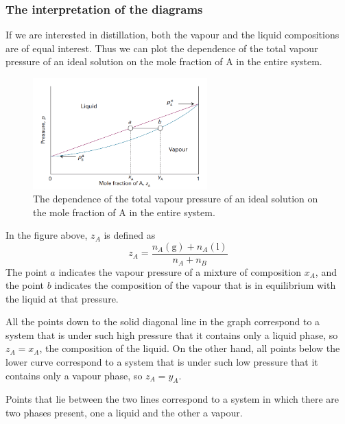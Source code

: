 \subsubsection{The interpretation of the diagrams}
If we are interested in distillation, both the vapour and the liquid compositions are of equal interest. Thus we can plot the dependence of the total vapour pressure of an ideal solution on the mole fraction of A in the entire system. 
\begin{figure}[H]
    \setlength{\abovecaptionskip}{0.5pt}
    \centering
    \includegraphics[width=0.6\textwidth]{"./fig/f2.png"}
    \caption{The dependence of the total vapour pressure of an ideal solution on the mole fraction of A in the entire system. }
\end{figure}
In the figure above, $z_A$ is defined as
$$z_A=\frac{n_A(\text{g})+n_A(\text{l})}{n_A+n_B}$$
The point $a$ indicates the vapour pressure of a mixture of composition $x_A$, and the point $b$ indicates the composition of the vapour that is in equilibrium with the liquid at that pressure.

All the points down to the solid diagonal line in the graph correspond to a system that is under such high pressure that it contains only a liquid phase, so $z_A =x_A$, the composition of the liquid. On the other hand, all points below the lower curve correspond to a system that is under such low pressure that it contains only a vapour phase, so $z_A =y_A$.

Points that lie between the two lines correspond to a system in which there are two phases present, one a liquid and the other a vapour.
